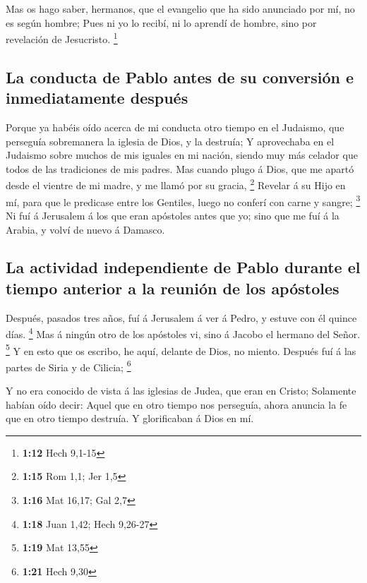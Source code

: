  Mas os hago saber, hermanos, que el evangelio que ha sido
anunciado por mí, no es según hombre;  Pues ni yo lo
recibí, ni lo aprendí de hombre, sino por revelación de Jesucristo.
\footnote{\textbf{1:12} Hech 9,1-15}

\hypertarget{la-conducta-de-pablo-antes-de-su-conversiuxf3n-e-inmediatamente-despuuxe9s}{%
\subsection{La conducta de Pablo antes de su conversión e inmediatamente
después}\label{la-conducta-de-pablo-antes-de-su-conversiuxf3n-e-inmediatamente-despuuxe9s}}

 Porque ya habéis oído acerca de mi conducta otro tiempo en
el Judaismo, que perseguía sobremanera la iglesia de Dios, y la
destruía;  Y aprovechaba en el Judaismo sobre muchos de mis
iguales en mi nación, siendo muy más celador que todos de las
tradiciones de mis padres.  Mas cuando plugo á Dios, que me
apartó desde el vientre de mi madre, y me llamó por su gracia,
\footnote{\textbf{1:15} Rom 1,1; Jer 1,5}  Revelar á su
Hijo en mí, para que le predicase entre los Gentiles, luego no conferí
con carne y sangre; \footnote{\textbf{1:16} Mat 16,17; Gal 2,7}
 Ni fuí á Jerusalem á los que eran apóstoles antes que yo;
sino que me fuí á la Arabia, y volví de nuevo á Damasco.

\hypertarget{la-actividad-independiente-de-pablo-durante-el-tiempo-anterior-a-la-reuniuxf3n-de-los-apuxf3stoles}{%
\subsection{La actividad independiente de Pablo durante el tiempo
anterior a la reunión de los
apóstoles}\label{la-actividad-independiente-de-pablo-durante-el-tiempo-anterior-a-la-reuniuxf3n-de-los-apuxf3stoles}}

 Después, pasados tres años, fuí á Jerusalem á ver á Pedro,
y estuve con él quince días. \footnote{\textbf{1:18} Juan 1,42; Hech
  9,26-27}  Mas á ningún otro de los apóstoles vi, sino á
Jacobo el hermano del Señor. \footnote{\textbf{1:19} Mat 13,55}
 Y en esto que os escribo, he aquí, delante de Dios, no
miento.  Después fuí á las partes de Siria y de Cilicia;
\footnote{\textbf{1:21} Hech 9,30}

 Y no era conocido de vista á las iglesias de Judea, que
eran en Cristo;  Solamente habían oído decir: Aquel que en
otro tiempo nos perseguía, ahora anuncia la fe que en otro tiempo
destruía.  Y glorificaban á Dios en mí.

